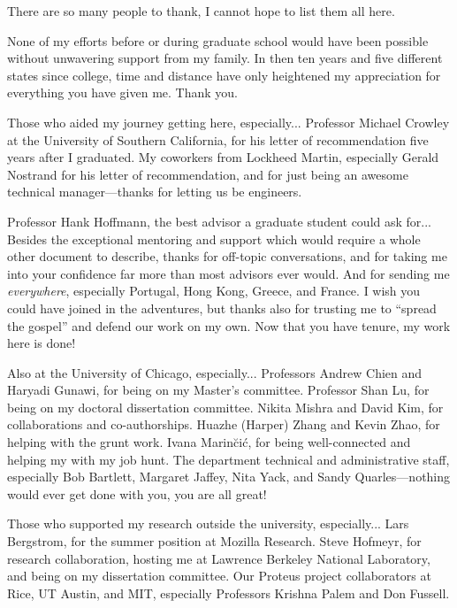 There are so many people to thank, I cannot hope to list them all here.

None of my efforts before or during graduate school would have been possible without unwavering support from my family.
In then ten years and five different states since college, time and distance have only heightened my appreciation for everything you have given me.
Thank you.

Those who aided my journey getting here, especially...
Professor Michael Crowley at the University of Southern California, for his letter of recommendation five years after I graduated.
My coworkers from Lockheed Martin, especially Gerald Nostrand for his letter of recommendation, and for just being an awesome technical manager---thanks for letting us be engineers.

Professor Hank Hoffmann, the best advisor a graduate student could ask for...
Besides the exceptional mentoring and support which would require a whole other document to describe, thanks for off-topic conversations, and for taking me into your confidence far more than most advisors ever would.
And for sending me \emph{everywhere}, especially Portugal, Hong Kong, Greece, and France.
I wish you could have joined in the adventures, but thanks also for trusting me to ``spread the gospel'' and defend our work on my own.
Now that you have tenure, my work here is done!

Also at the University of Chicago, especially...
Professors Andrew Chien and Haryadi Gunawi, for being on my Master's committee.
Professor Shan Lu, for being on my doctoral dissertation committee.
Nikita Mishra and David Kim, for collaborations and co-authorships.
Huazhe (Harper) Zhang and Kevin Zhao, for helping with the grunt work.
Ivana Marin{\u c}i{\'c}, for being well-connected and helping my with my job hunt.
The department technical and administrative staff, especially Bob Bartlett, Margaret Jaffey, Nita Yack, and Sandy Quarles---nothing would ever get done with you, you are all great!

Those who supported my research outside the university, especially...
Lars Bergstrom, for the summer position at Mozilla Research.
Steve Hofmeyr, for research collaboration, hosting me at Lawrence Berkeley National Laboratory, and being on my dissertation committee.
Our Proteus project collaborators at Rice, UT Austin, and MIT, especially Professors Krishna Palem and Don Fussell.

